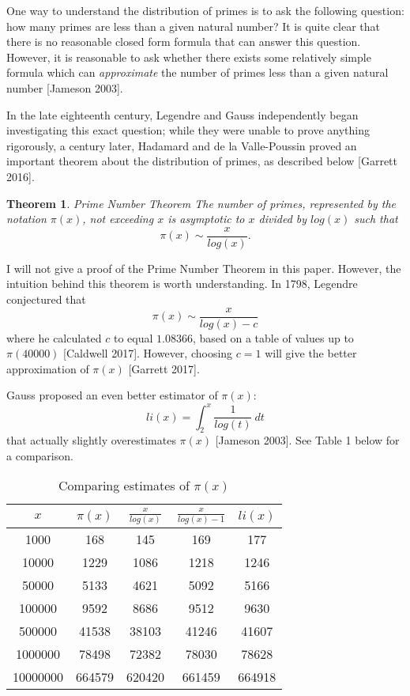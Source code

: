 \documentclass[11pt]{article}
\newtheorem{thm}{Theorem}[section]
\begin{document}
One way to understand the distribution of primes is to ask the following question: how many primes are less than a given natural number? It is quite clear that there is no reasonable closed form formula that can answer this question. However, it is reasonable to ask whether there exists some relatively simple formula which can {\it approximate} the number of primes less than a given natural number [Jameson 2003].

In the late eighteenth century, Legendre and Gauss independently began investigating this exact question; while they were unable to prove anything rigorously, a century later, Hadamard and de la Valle-Poussin proved an important theorem about the distribution of primes, as described below [Garrett 2016]. 

\begin{thm}
\emph{Prime Number Theorem}
The number of primes, represented by the notation $\pi(x)$, not exceeding $x$ is asymptotic to $x$ divided by $log(x)$ such that $$\pi(x) \sim \frac{x}{log(x)}.$$
\end{thm}

I will not give a proof of the Prime Number Theorem in this paper. However, the intuition behind this theorem is worth understanding.  In 1798, Legendre conjectured that $$\pi(x) \sim \frac{x}{log(x) - c}$$ where he calculated $c$ to equal $1.08366$, based on a table of values up to $\pi(40000)$ [Caldwell 2017]. However, choosing $c = 1$ will give the better approximation of $\pi(x)$ [Garrett 2017]. 

Gauss proposed an even better estimator of $\pi(x)$: $$li(x) = \int_{2}^{x} \frac{1}{log(t)} \ dt$$ that actually slightly overestimates $\pi(x)$ [Jameson 2003]. See Table 1 below for a comparison. 

\begin{table}[h!]
\centering
 \begin{tabular}{||c c c c c||} 
 \hline
 $x$ & $\pi(x)$ & $\frac{x}{log(x)}$ & $\frac{x}{log(x) - 1}$ & $li(x)$\\ [1ex] 
 \hline\hline
 1000 & 168 & 145 & 169  & 177\\ 
 \hline
 10000 & 1229 & 1086 & 1218 & 1246\\
 \hline
 50000 & 5133 & 4621  & 5092 & 5166\\
 \hline
 100000 & 9592 & 8686 & 9512  & 9630\\
 \hline
 500000 & 41538 & 38103 & 41246 & 41607\\
 \hline
 1000000 & 78498 & 72382 & 78030 & 78628\\
 \hline
 10000000 & 664579 & 620420 & 661459  & 664918\\[1ex]  
 \hline
\end{tabular}
\\[10pt]
\caption{Comparing estimates of $\pi(x)$}
\end{table}
\end{document}
